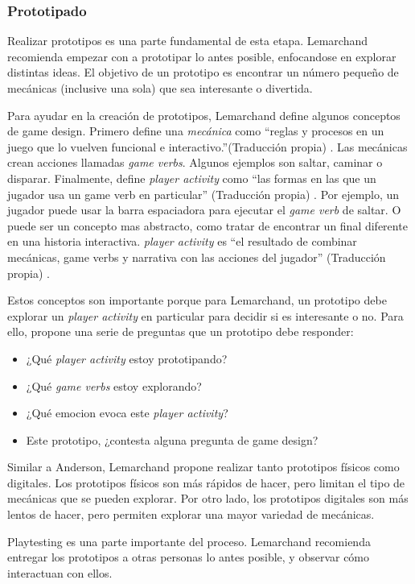 \subsubsection{Prototipado}
\par Realizar prototipos es una parte fundamental de esta etapa. Lemarchand recomienda empezar con a prototipar lo antes posible, enfocandose en explorar distintas ideas. El objetivo de un prototipo es encontrar un número pequeño de mecánicas (inclusive una sola) que sea interesante o divertida. 
\par Para ayudar en la creación de prototipos, Lemarchand define algunos conceptos de game design. Primero define una \textit{mecánica} como ``reglas y procesos en un juego que lo vuelven funcional e interactivo.''(Traducción propia) \cite{lemarchandPlayfulProductionProcess2021}. Las mecánicas crean acciones llamadas \textit{game verbs}. Algunos ejemplos son saltar, caminar o disparar. Finalmente, define \textit{player activity} como ``las formas en las que un jugador usa un game verb en particular'' (Traducción propia) \cite{lemarchandPlayfulProductionProcess2021}. Por ejemplo, un jugador puede usar la barra espaciadora para ejecutar el \textit{game verb} de saltar. O puede ser un concepto mas abstracto, como tratar de encontrar un final diferente en una historia interactiva. \textit{player activity} es ``el resultado de combinar mecánicas, game verbs y narrativa con las acciones del jugador'' (Traducción propia) \cite{lemarchandPlayfulProductionProcess2021}. 
\par Estos conceptos son importante porque para Lemarchand, un prototipo debe explorar un \textit{player activity} en particular para decidir si es interesante o no. Para ello, propone una serie de preguntas que un prototipo debe responder:
\begin{itemize}
    \item ¿Qué \textit{player activity} estoy prototipando?
    \item ¿Qué \textit{game verbs} estoy explorando?
    \item ¿Qué emocion evoca este \textit{player activity}?
    \item Este prototipo, ¿contesta alguna pregunta de game design? 
\end{itemize}
\bigbreak
\par Similar a Anderson, Lemarchand propone realizar tanto prototipos físicos como digitales. Los prototipos físicos son más rápidos de hacer, pero limitan el tipo de mecánicas que se pueden explorar. Por otro lado, los prototipos digitales son más lentos de hacer, pero permiten explorar una mayor variedad de mecánicas.
\par Playtesting es una parte importante del proceso. Lemarchand recomienda entregar los prototipos a otras personas lo antes posible, y observar cómo interactuan con ellos.
%
%
